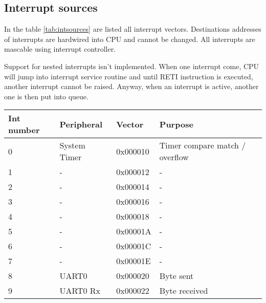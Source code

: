 \subsection{Interrupt sources}

In the table \ref{tab:intsources} are listed all interrupt vectors. Destinations
addresses of interrupts are hardwired into CPU and cannot be changed. All
interrupts are mascable using interrupt controller.

Support for nested interrupts isn't implemented. When one interrupt come, CPU
will jump into interrupt service routine and until RETI instruction is executed,
another interrupt cannot be raised. Anyway, when an interrupt is active, another
one is then put into queue.

\begin{table}[h]
    \centering
    \begin{tabular}{|l|l|l|l|}
        \hline
        \textbf{Int number} & \textbf{Peripheral} & \textbf{Vector} & \textbf{Purpose}               \\ \hline
        0                   & System Timer        & 0x000010        & Timer compare match / overflow \\ \hline
        1                   & -                   & 0x000012        & -                              \\ \hline
        2                   & -                   & 0x000014        & -                              \\ \hline
        3                   & -                   & 0x000016        & -                              \\ \hline
        4                   & -                   & 0x000018        & -                              \\ \hline
        5                   & -                   & 0x00001A        & -                              \\ \hline
        6                   & -                   & 0x00001C        & -                              \\ \hline
        7                   & -                   & 0x00001E        & -                              \\ \hline
        8                   & UART0               & 0x000020        & Byte sent                      \\ \hline
        9                   & UART0 Rx            & 0x000022        & Byte received                  \\ \hline

\end{tabular}
\end{table}
